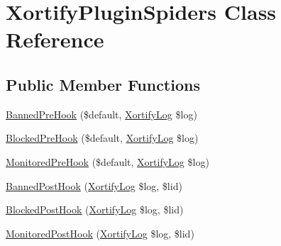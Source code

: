 \hypertarget{class_xortify_plugin_spiders}{\section{Xortify\-Plugin\-Spiders Class Reference}
\label{class_xortify_plugin_spiders}
}
\subsection*{Public Member Functions}
\begin{DoxyCompactItemize}
\item 
\hyperlink{class_xortify_plugin_spiders_aacd0a27d3740aae83c03e921f6e58783}{Banned\-Pre\-Hook} (\$default, \hyperlink{class_xortify_log}{Xortify\-Log} \$log)
\item 
\hyperlink{class_xortify_plugin_spiders_a1b0001df5cf5ef18a5181774ce16b089}{Blocked\-Pre\-Hook} (\$default, \hyperlink{class_xortify_log}{Xortify\-Log} \$log)
\item 
\hyperlink{class_xortify_plugin_spiders_abbd4e782a10042ec86d3bef94daad89a}{Monitored\-Pre\-Hook} (\$default, \hyperlink{class_xortify_log}{Xortify\-Log} \$log)
\item 
\hyperlink{class_xortify_plugin_spiders_a6bc03033f17c2fcede4d020d1cfbcc48}{Banned\-Post\-Hook} (\hyperlink{class_xortify_log}{Xortify\-Log} \$log, \$lid)
\item 
\hyperlink{class_xortify_plugin_spiders_a1cb2408e6422326482b2e8eb45d2d0c1}{Blocked\-Post\-Hook} (\hyperlink{class_xortify_log}{Xortify\-Log} \$log, \$lid)
\item 
\hyperlink{class_xortify_plugin_spiders_aa4a3d909c3769e0c3c7b6488f8659a1d}{Monitored\-Post\-Hook} (\hyperlink{class_xortify_log}{Xortify\-Log} \$log, \$lid)
\end{DoxyCompactItemize}



